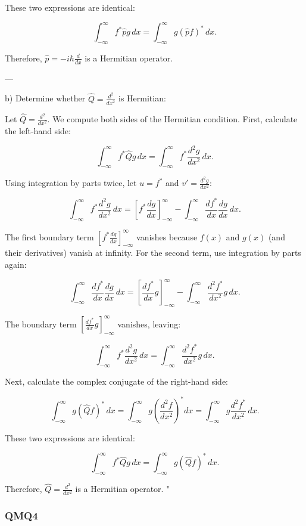 These two expressions are identical:

\[
\int_{-\infty}^\infty f^* \hat{p} g \, dx = \int_{-\infty}^\infty g (\hat{p} f)^* \, dx.
\]

Therefore, \( \hat{p} = -i\hbar \frac{d}{dx} \) is a Hermitian operator. 

---

b) Determine whether \( \hat{Q} = \frac{d^2}{dx^2} \) is Hermitian:

Let \( \hat{Q} = \frac{d^2}{dx^2} \). We compute both sides of the Hermitian condition. First, calculate the left-hand side:

\[
\int_{-\infty}^\infty f^* \hat{Q} g \, dx = \int_{-\infty}^\infty f^* \frac{d^2 g}{dx^2} \, dx.
\]

Using integration by parts twice, let \( u = f^* \) and \( v' = \frac{d^2 g}{dx^2} \):

\[
\int_{-\infty}^\infty f^* \frac{d^2 g}{dx^2} \, dx = \left[ f^* \frac{dg}{dx} \right]_{-\infty}^\infty - \int_{-\infty}^\infty \frac{d f^*}{dx} \frac{dg}{dx} \, dx.
\]

The first boundary term \( \left[ f^* \frac{dg}{dx} \right]_{-\infty}^\infty \) vanishes because \( f(x) \) and \( g(x) \) (and their derivatives) vanish at infinity. For the second term, use integration by parts again:

\[
\int_{-\infty}^\infty \frac{d f^*}{dx} \frac{dg}{dx} \, dx = \left[ \frac{d f^*}{dx} g \right]_{-\infty}^\infty - \int_{-\infty}^\infty \frac{d^2 f^*}{dx^2} g \, dx.
\]

The boundary term \( \left[ \frac{d f^*}{dx} g \right]_{-\infty}^\infty \) vanishes, leaving:

\[
\int_{-\infty}^\infty f^* \frac{d^2 g}{dx^2} \, dx = \int_{-\infty}^\infty \frac{d^2 f^*}{dx^2} g \, dx.
\]

Next, calculate the complex conjugate of the right-hand side:

\[
\int_{-\infty}^\infty g (\hat{Q} f)^* \, dx = \int_{-\infty}^\infty g \left(\frac{d^2 f}{dx^2}\right)^* dx = \int_{-\infty}^\infty g \frac{d^2 f^*}{dx^2} \, dx.
\]

These two expressions are identical:

\[
\int_{-\infty}^\infty f^* \hat{Q} g \, dx = \int_{-\infty}^\infty g (\hat{Q} f)^* \, dx.
\]

Therefore, \( \hat{Q} = \frac{d^2}{dx^2} \) is a Hermitian operator.
"

\subsubsection{QMQ4}

